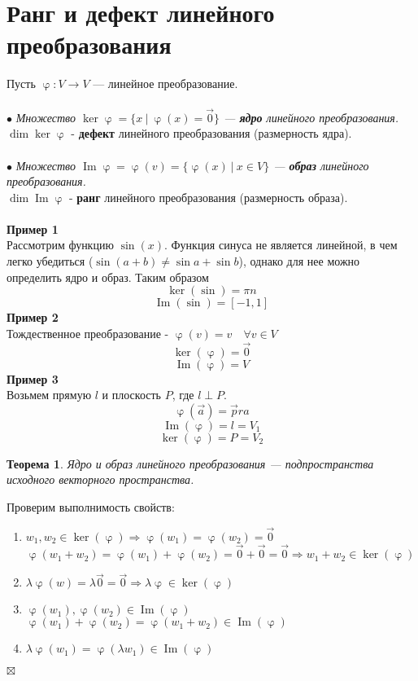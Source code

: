\documentclass[a4paper, 12pt]{article}
\newtheorem*{theorem}{Теорема}
\newenvironment{Proof}
{\par\noindent{$\blacklozenge$}}
{\hfill$\scriptstyle\boxtimes$}
\renewcommand{\Im}{\operatorname{Im}}
\renewcommand{\ker}{\operatorname{ker}}
\renewcommand{\varphi}{\upvarphi}
\begin{document}
\section{Ранг и дефект линейного преобразования}
Пусть $\varphi:V\rightarrow V$ --- линейное преобразование.\\\\
$\bullet$ \textit{Множество $\ker \varphi = \{x\ |\ \varphi(x)=\vec 0\}$ --- \textbf{ядро} линейного преобразования.}\\
$\dim \ker \varphi$ - \textbf{дефект} линейного преобразования (размерность ядра).\\\\
$\bullet$ \textit{Множество $\Im \varphi = \varphi(v)=\{\varphi(x)\ |\ x \in V\}$ --- \textbf{образ} линейного преобразования.}\\
$\dim \Im \varphi$ - \textbf{ранг} линейного преобразования (размерность образа).\\\\
\textbf{Пример 1}\\
Рассмотрим функцию $\sin(x)$. Функция синуса не является линейной, в чем легко убедиться ($\sin(a+b) \neq \sin a + \sin b$), однако для нее можно определить ядро и образ. Таким образом
$$\ker (\sin) = {\pi n}$$
$$\Im (\sin) = [-1,1]$$
\textbf{Пример 2}\\
Тождественное преобразование - $\varphi(v)=v \quad \forall v \in V$
$$\ker( \varphi) = \vec 0$$
$$\Im (\varphi) = V$$
\textbf{Пример 3}\\
Возьмем прямую $l$ и плоскость $P$, где $l \perp P$.
$$\varphi(\vec a)=\vec pr a$$
$$\Im (\varphi) = l = V_1$$
$$\ker (\varphi) = P = V_2$$
\begin{theorem}
    Ядро и образ линейного преобразования --- подпространства исходного векторного пространства.
\end{theorem}
\begin{Proof}
	Проверим выполнимость свойств:
   \begin{enumerate}
       \item $w_1,w_2 \in \ker (\varphi) \Rightarrow \varphi(w_1)=\varphi(w_2)=\vec 0$
       $\varphi(w_1+w_2)=\varphi(w_1)+\varphi(w_2)=\vec 0+ \vec 0=\vec 0 \Rightarrow w_1+w_2 \in \ker (\varphi)$
       \item $\lambda \varphi(w)=\lambda \vec 0=\vec 0 \Rightarrow \lambda \varphi \in \ker (\varphi)$
       \item $\varphi(w_1),\varphi(w_2) \in \Im (\varphi)$\\
       $\varphi(w_1)+\varphi(w_2)=\varphi(w_1+w_2) \in \Im (\varphi)$
       \item $\lambda \varphi(w_1)=\varphi(\lambda w_1) \in \Im (\varphi)$
   \end{enumerate}
\end{Proof}\\
\end{document}
